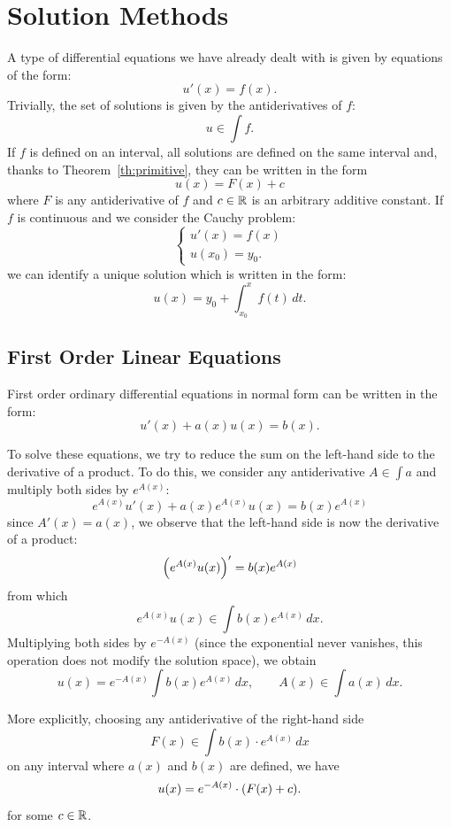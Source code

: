 \section{Solution Methods}

A type of differential equations we have already dealt with is given by
equations of the form:
\[
   u'(x) = f(x).
\]
Trivially, the set of solutions is given by the antiderivatives of $f$:
\[
  u \in \int f.
\]
If $f$ is defined on an interval, all solutions are defined on the same interval
and, thanks to Theorem~\ref{th:primitive}, they can be written in the form
\[
  u(x) = F(x) + c
\]
where $F$ is any antiderivative of $f$ and $c\in {\mathbb R}$ is an arbitrary additive
constant.
If $f$ is continuous and we consider the Cauchy problem:
\[
  \begin{cases}
    u'(x) = f(x) \\
    u(x_0) = y_0.
  \end{cases}
\]
we can identify a unique solution which is written in the form:
\[
  u(x) = y_0 + \int_{x_0}^x f(t)\, dt.
\]

\subsection{First Order Linear Equations}

First order ordinary differential equations in normal form can be written in the
form:
\mymark{***}
\begin{equation}\label{eq:47744}
   u'(x) + a(x) u(x) = b(x).
\end{equation}

To solve these equations, we try to reduce the sum on the left-hand side to the
derivative of a product.
To do this, we consider any antiderivative $A\in \int a$ and multiply both sides
by $e^{A(x)}$:
\[
  e^{A(x)} u'(x) + a(x) e^{A(x)} u(x) = b(x) e^{A(x)}
\]
since $A'(x) = a(x)$, we observe that the left-hand side is now the derivative
of a product:
\[
  {\left( e^{A(x)}u(x) \right)}' = b(x) e^{A(x)}
\]
from which
\[
  e^{A(x)} u(x) \in \int b(x) e^{A(x)}\, dx.
\]
Multiplying both sides by $e^{-A(x)}$ (since the exponential never vanishes,
this operation does not modify the solution space), we obtain
\[
u(x) = e^{-A(x)} \int b(x) e^{A(x)}\, dx, \qquad
A(x) \in \int a(x)\, dx.
\]

More explicitly, choosing any antiderivative of the right-hand side
\[
  F(x) \in \int b(x) \cdot e^{A(x)}\, dx
\]
on any interval where $a(x)$ and $b(x)$ are defined, we have
\[
  u(x) = e^{-A(x)}\cdot {\left( F(x) + c \right)}.
\]
for some $c\in {\mathbb R}$.

